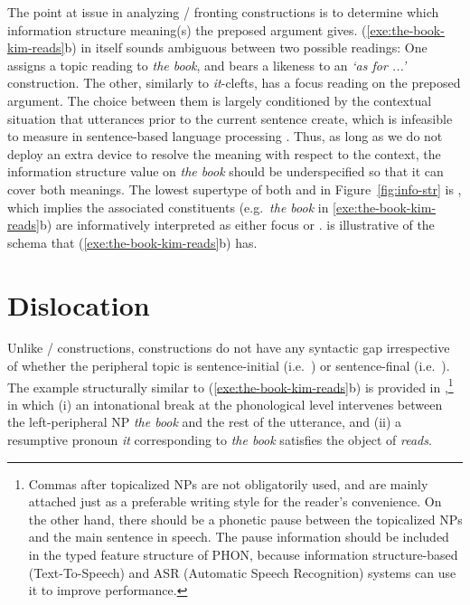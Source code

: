 The point at issue in analyzing / fronting
constructions is to determine which information structure meaning(s)
the preposed argument gives. (\ref{exe:the-book-kim-reads}b) in itself
sounds ambiguous between two possible readings: One assigns a topic
reading to \textit{the book}, and bears a likeness to an \textit{`as
  for ...'}  construction. The other, similarly to \textit{it}-clefts,
has a focus reading on the preposed argument. The choice between them
is largely conditioned by the contextual situation that utterances
prior to the current sentence create, which is infeasible to measure
in sentence-based language processing \citep{kuhn:96}. Thus, as long
as we do not deploy an extra device to resolve the meaning with
respect to the context, the information structure value on \textit{the
  book} should be underspecified so that it can cover both
meanings. The lowest supertype of both
 and  in Figure~\ref{fig:info-str} is
, which implies the associated constituents
(e.g.\ \textit{the book} in \ref{exe:the-book-kim-reads}b) are
informatively interpreted as either focus or
.  is illustrative of the
schema that (\ref{exe:the-book-kim-reads}b) has.






\largerpage[-2]
\section{Dislocation}
\label{10:sec:dislocation}


Unlike /  constructions,
 constructions do not have any syntactic gap
irrespective of whether the peripheral topic is sentence-initial
(i.e.\ ) or sentence-final (i.e.\ ). The example structurally similar to
(\ref{exe:the-book-kim-reads}b) is provided in
,\footnote{Commas after topicalized
  NPs are not obligatorily used, and are mainly attached just as a
  preferable writing style for the reader's convenience.  On the other
  hand, there should be a phonetic pause between the topicalized NPs
  and the main sentence in speech. The pause information should be
  included in the typed feature structure of PHON, because information
  structure-based  (Text-To-Speech) and ASR (Automatic Speech
  Recognition) systems can use it to improve performance.} in which
(i) an intonational break at the phonological level intervenes between
the left-peripheral NP \textit{the book} and the rest of the
utterance, and (ii) a resumptive pronoun \textit{it} corresponding to
\textit{the book} satisfies the object of \textit{reads}.



